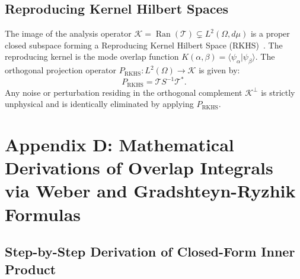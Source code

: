 \documentclass[11pt,a4paper]{article}
\begin{document}
\subsection{Reproducing Kernel Hilbert Spaces}

The image of the analysis operator $\mathcal{K} = \operatorname{Ran}(\mathcal{T}) \subsetneq L^2(\Omega, d\mu)$ is a proper closed subspace forming a Reproducing Kernel Hilbert Space (RKHS)~\cite{PaulsenRaghupathi2016}. The reproducing kernel is the mode overlap function $K(\alpha, \beta) = \langle \psi_\alpha | \psi_\beta \rangle$. The orthogonal projection operator $P_{\text{RKHS}}: L^2(\Omega) \to \mathcal{K}$ is given by:
\begin{equation}
P_{\text{RKHS}} = \mathcal{T} S^{-1} \mathcal{T}^*.
\label{eq:app_rkhs_proj}
\end{equation}
Any noise or perturbation residing in the orthogonal complement $\mathcal{K}^\perp$ is strictly unphysical and is identically eliminated by applying $P_{\text{RKHS}}$.

\section{Appendix D: Mathematical Derivations of Overlap Integrals via Weber and Gradshteyn-Ryzhik Formulas}
\label{app:derivations}

\subsection{Step-by-Step Derivation of Closed-Form Inner Product}
\end{document}
